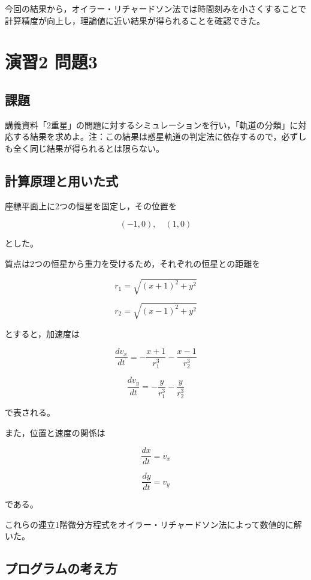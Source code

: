 \documentclass[uplatex,dvipdfmx]{jsarticle}
\begin{document}
今回の結果から，オイラー・リチャードソン法では時間刻みを小さくすることで計算精度が向上し，理論値に近い結果が得られることを確認できた。


\section{演習2 問題3}

\subsection{課題}
講義資料「2重星」の問題に対するシミュレーションを行い，「軌道の分類」に対応する結果を求めよ。注：この結果は惑星軌道の判定法に依存するので，必ずしも全く同じ結果が得られるとは限らない。

\subsection{計算原理と用いた式}

座標平面上に2つの恒星を固定し，その位置を

\[
(-1,0), \quad (1,0)
\]

とした。

質点は2つの恒星から重力を受けるため，それぞれの恒星との距離を

\[
r_1=\sqrt{(x+1)^2+y^2}
\]

\[
r_2=\sqrt{(x-1)^2+y^2}
\]

とすると，加速度は

\begin{equation}
\frac{dv_x}{dt}
=
-\frac{x+1}{r_1^3}
-\frac{x-1}{r_2^3}
\end{equation}

\begin{equation}
\frac{dv_y}{dt}
=
-\frac{y}{r_1^3}
-\frac{y}{r_2^3}
\end{equation}

で表される。

また，位置と速度の関係は

\begin{equation}
\frac{dx}{dt}=v_x
\end{equation}

\begin{equation}
\frac{dy}{dt}=v_y
\end{equation}

である。

これらの連立1階微分方程式をオイラー・リチャードソン法によって数値的に解いた。

\subsection{プログラムの考え方}
\end{document}
